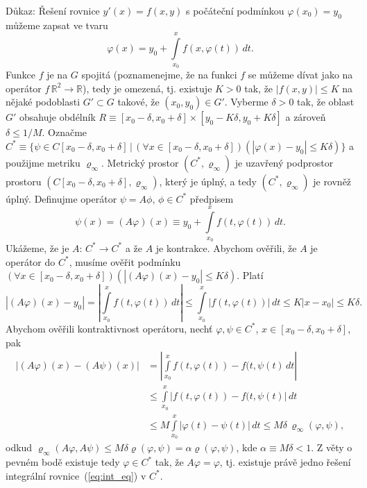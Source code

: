 Důkaz: Řešení rovnice $y'(x) = f(x,y)$ s počáteční podmínkou $\varphi(x_0)=y_0$
můžeme zapsat ve tvaru
\begin{equation}\label{eq:int_eq}
   \varphi(x) = y_0 + \int\limits_{x_0}^x f(x,\varphi(t))\,dt.
\end{equation}
Funkce $f$ je na $G$ spojitá (poznamenejme, že na funkci $f$
se můžeme dívat jako na operátor $f\,\mathbb{R}^2\rightarrow\mathbb{R}$),
tedy je omezená, tj. existuje $K>0$ tak, že $|f(x,y)|\leq K$ na nějaké
podoblasti $G'\subset G$ takové, že $(x_0,y_0)\in G'$.
Vyberme $\delta>0$ tak, že oblast $G'$ obsahuje obdélník
$R\equiv [x_0-\delta,x_0+\delta]\times [y_0-K\delta,y_0+K\delta]$
a zároveň $\delta\leq 1/M$.
Označme $C^*\equiv\{\psi\in C[x_0-\delta,x_0+\delta]\,|\,
(\forall x\in[x_0-\delta,x_0+\delta])(|\varphi(x)-y_0|\leq K\delta)\}$
a použijme metriku $\varrho_{\infty}$.
Metrický prostor $(C^*,\varrho_{\infty})$ je uzavřený podprostor prostoru
$(C[x_0-\delta,x_0+\delta],\varrho_{\infty})$, který je úplný, a tedy
$(C^*,\varrho_{\infty})$ je rovněž úplný.
Definujme operátor $\psi=A\phi$, $\phi\in C^*$ předpisem
\[
   \psi(x)=(A\varphi)(x)\equiv y_0+\int\limits_{x_0}^x f(t,\varphi(t))\,dt.
\]
Ukážeme, že je $A:\,C^*\rightarrow C^*$ a že $A$ je kontrakce.
Abychom ověřili, že $A$ je operátor do $C^*$, musíme ověřit podmínku
$(\forall x\in[x_0-\delta,x_0+\delta])(|(A\varphi)(x)-y_0|\leq K\delta)$.
Platí
\[
   |(A\varphi)(x)-y_0|=\left|\int\limits_{x_0}^xf(t,\varphi(t))\,dt\right|
                      \leq\int\limits_{x_0}^x|f(t,\varphi(t))|\,dt
                      \leq K|x-x_0|\leq K\delta.
\]
Abychom ověřili kontraktivnost operátoru, nechť $\varphi,\psi\in C^*$, 
$x\in[x_0-\delta,x_0+\delta]$, pak
\[
  \begin{split}
   |(A\varphi)(x)-(A\psi)(x)|&=
    \left|\int\limits_{x_0}^xf(t,\varphi(t))-f(t,\psi(t)\,dt\right|\\
    &\leq\int\limits_{x_0}^x|f(t,\varphi(t))-f(t,\psi(t)|\,dt\\
    &\leq M\int\limits_{x_0}^x|\varphi(t)-\psi(t)|\,dt
    \leq M\delta\,\varrho_{\infty}(\varphi,\psi),
  \end{split}
\]
odkud $\varrho_{\infty}(A\varphi,A\psi)\leq M\delta\varrho(\varphi,\psi)
=\alpha\varrho(\varphi,\psi)$, kde $\alpha\equiv M\delta<1$.
Z věty o pevném bodě existuje tedy $\varphi\in C^*$ tak, že
$A\varphi=\varphi$, tj. existuje právě jedno řešení integrální 
rovnice~(\ref{eq:int_eq}) v $C^*$.

